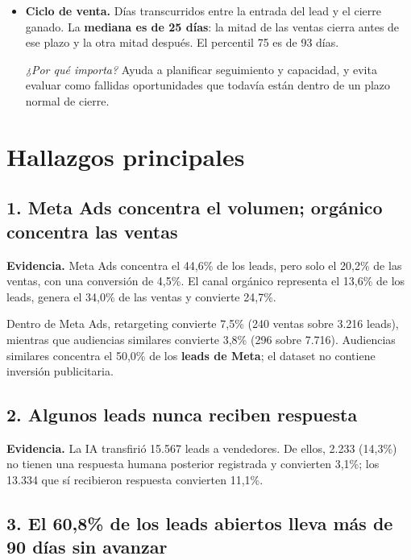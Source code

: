 \documentclass[11pt,a4paper]{article}
\begin{document}
\begin{itemize}
\textit{¿Por qué importa?} Es una aproximación más realista al trabajo comercial pendiente. Si se reportaran todos los leads abiertos como cartera, el 60,8\% correspondería a oportunidades que llevan más de 90 días sin avanzar.

\item \textbf{Ciclo de venta.}
Días transcurridos entre la entrada del lead y el cierre ganado. La \textbf{mediana es de 25 días}: la mitad de las ventas cierra antes de ese plazo y la otra mitad después. El percentil 75 es de 93 días.

\textit{¿Por qué importa?} Ayuda a planificar seguimiento y capacidad, y evita evaluar como fallidas oportunidades que todavía están dentro de un plazo normal de cierre. 

\end{itemize}

\section*{Hallazgos principales}

\subsection*{1. Meta Ads concentra el volumen; orgánico concentra las ventas}

\textbf{Evidencia.}
Meta Ads concentra el 44,6\% de los leads, pero solo el 20,2\% de las ventas, con una conversión de 4,5\%. El canal orgánico representa el 13,6\% de los leads, genera el 34,0\% de las ventas y convierte 24,7\%.

Dentro de Meta Ads, retargeting convierte 7,5\% (240 ventas sobre 3.216 leads), mientras que audiencias similares convierte 3,8\% (296 sobre 7.716). Audiencias similares concentra el 50,0\% de los \textbf{leads de Meta}; el dataset no contiene inversión publicitaria.

\subsection*{2. Algunos leads nunca reciben respuesta}

\textbf{Evidencia.}
La IA transfirió 15.567 leads a vendedores. De ellos, 2.233 (14,3\%) no tienen una respuesta humana posterior registrada y convierten 3,1\%; los 13.334 que sí recibieron respuesta convierten 11,1\%.

\subsection*{3. El 60,8\% de los leads abiertos lleva más de 90 días sin avanzar}
\end{document}
